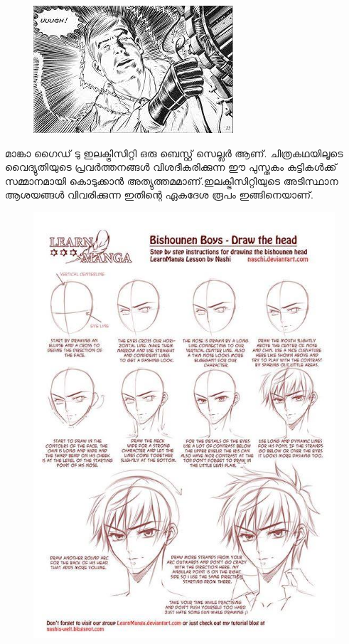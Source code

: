 \documentclass[10pt,a4paper]{report}
\begin{document}
 \begin{figure}[H]
  \center
\includegraphics[scale=.5]{images/manga2}
\label{manga2}
\caption{   }
\end{figure}
   മാങ്കാ ഗൈഡ് ടു ഇലക്ട്രിസിറ്റി ഒരു ബെസ്റ്റ് സെല്ലര്‍ ആണ്. ചിത്രകഥയിലൂടെ വൈദ്യുതിയുടെ പ്രവര്‍ത്തനങ്ങള്‍ വിശദീകരിക്കുന്ന ഈ പുസ്തകം കുട്ടികള്‍ക്ക് സമ്മാനമായി കൊടുക്കാന്‍ അത്യുത്തമമാണ്.ഇലക്ട്രിസിറ്റിയുടെ അടിസ്ഥാന ആശയങ്ങള്‍ വിവരിക്കുന്ന ഇതിന്റെ ഏകദേശ രൂപം ഇങ്ങിനെയാണ്.
 \begin{figure}[H]
  \center
\includegraphics[scale=.25]{images/manga3}
\label{manga3}
\caption{   }
\end{figure}
\end{document}
